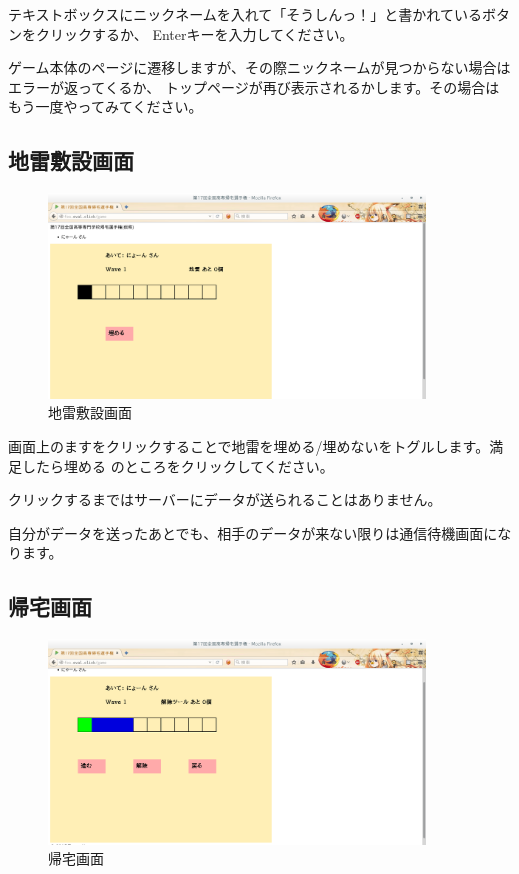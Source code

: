 \documentclass{jsarticle}
\begin{document}
テキストボックスにニックネームを入れて「そうしんっ！」と書かれているボタンをクリックするか、
Enterキーを入力してください。

ゲーム本体のページに遷移しますが、その際ニックネームが見つからない場合はエラーが返ってくるか、
トップページが再び表示されるかします。その場合はもう一度やってみてください。

\subsection{地雷敷設画面}\label{ux5730ux96f7ux6577ux8a2dux753bux9762}

\begin{figure}[htbp]
\centering
\includegraphics[width=10cm]{./mine.png}
\caption{地雷敷設画面}
\end{figure}

画面上のますをクリックすることで地雷を埋める/埋めないをトグルします。満足したら埋める
のところをクリックしてください。

クリックするまではサーバーにデータが送られることはありません。

自分がデータを送ったあとでも、相手のデータが来ない限りは通信待機画面になります。

\subsection{帰宅画面}\label{ux5e30ux5b85ux753bux9762}

\begin{figure}[htbp]
\centering
\includegraphics[width=10cm]{./do.png}
\caption{帰宅画面}
\end{figure}
\end{document}
